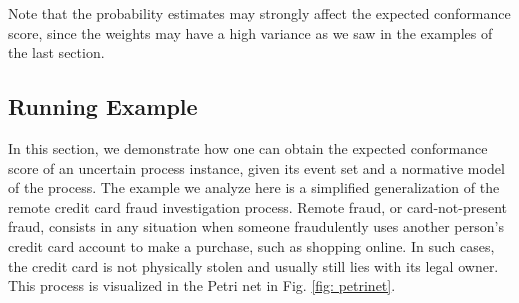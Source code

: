 Note that the probability estimates may strongly affect the expected conformance score, since the weights may have a high variance as we saw in the examples of the last section.

\subsection{Running Example}
In this section, we demonstrate how one can obtain the expected conformance score of an uncertain process instance, given its event set and a normative model of the process.
The example we analyze here is a simplified generalization of the remote credit card fraud investigation process.
Remote fraud, or card-not-present fraud, consists in any situation when someone fraudulently uses another person's credit card account to make a purchase, such as shopping online.
In such cases, the credit card is not physically stolen and usually still lies with its legal owner.
This process is visualized in the Petri net in Fig. \ref{fig: petrinet}.

